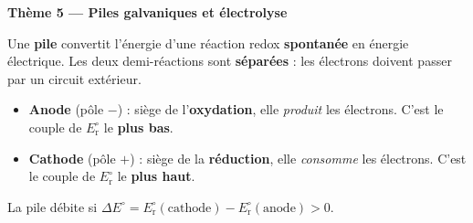 \documentclass[11pt,a4paper]{article}
\begin{document}
\begin{center}\color{primarydark}\Large\bfseries Thème 5 — Piles galvaniques et électrolyse\end{center}

Une \textbf{pile} convertit l'énergie d'une réaction redox \textbf{spontanée} en énergie électrique.
Les deux demi-réactions sont \textbf{séparées} : les électrons doivent passer par un circuit
extérieur.

\begin{cle}
\begin{itemize}[leftmargin=1.5em,topsep=1pt,itemsep=0pt]
  \item \textbf{Anode} (pôle $-$) : siège de l'\textbf{oxydation}, elle \emph{produit} les électrons.
        C'est le couple de $E_{\mathrm{r}}^{\circ}$ le \textbf{plus bas}.
  \item \textbf{Cathode} (pôle $+$) : siège de la \textbf{réduction}, elle \emph{consomme} les
        électrons. C'est le couple de $E_{\mathrm{r}}^{\circ}$ le \textbf{plus haut}.
\end{itemize}
La pile débite si $\Delta E^{\circ}=E_{\mathrm{r}}^{\circ}(\text{cathode})-E_{\mathrm{r}}^{\circ}
(\text{anode})>0$.
\end{cle}
\end{document}
